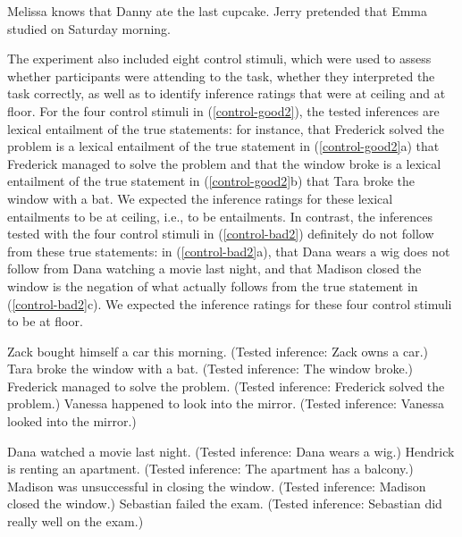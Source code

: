 \documentclass[11pt,fleqn]{article}
\newcommand{\6}{\mbox{$[\hspace*{-.6mm}[$}}
\newcommand{\9}{\mbox{$]\hspace*{-.6mm}]$}}
\begin{document}
\begin{exe}
\ex\label{stims2}
\begin{xlist}
 Melissa knows that Danny ate the last cupcake.
 Jerry pretended that Emma studied on Saturday morning.
\end{xlist}
\end{exe}

The experiment also included eight control stimuli, which were used to assess whether participants were attending to the task, whether they interpreted the task correctly, as well as to identify inference ratings that were at ceiling and at floor. For the four control stimuli in (\ref{control-good2}), the tested inferences are lexical entailment of the true statements: for instance, that Frederick solved the problem is a lexical entailment of the true statement in (\ref{control-good2}a) that Frederick managed to solve the problem and that the window broke is a lexical entailment of the true statement in (\ref{control-good2}b) that Tara broke the window with a bat. We expected the inference ratings for these lexical entailments to be at ceiling, i.e., to be entailments. In contrast, the inferences tested with the four control stimuli in (\ref{control-bad2}) definitely do not follow from these true statements: in (\ref{control-bad2}a), that Dana wears a wig does not follow from Dana watching a movie last night, and that Madison closed the window is the negation of what actually follows from the true statement in (\ref{control-bad2}c). We expected the inference ratings for these four control stimuli to be at floor.

\begin{exe}
\ex\label{control-good2}
\begin{xlist}
 Zack bought himself a car this morning. (Tested inference: Zack owns a car.)
 Tara broke the window with a bat. (Tested inference: The window broke.)
 Frederick managed to solve the problem. (Tested inference: Frederick solved the problem.)
 Vanessa happened to look into the mirror. (Tested inference: Vanessa looked into the mirror.)
\end{xlist}
\ex\label{control-bad2}
\begin{xlist}
 Dana watched a movie last night. (Tested inference: Dana wears a wig.)
 Hendrick is renting an apartment. (Tested inference: The apartment has a balcony.)
 Madison was unsuccessful in closing the window. (Tested inference:  Madison closed the window.)
 Sebastian failed the exam. (Tested inference: Sebastian did really well on the exam.)
\end{xlist}
\end{exe}
\end{document}
